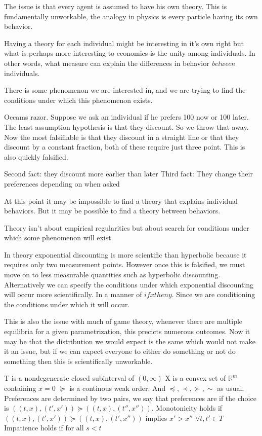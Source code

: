 \documentclass[11pt]{article}
\numberwithin{equation}{section}
\begin{document}
The issue is that every agent is assumed to have his own theory. This is fundamentally unworkable, the analogy in physics is every particle having its own behavior. 

Having a theory for each individual might be interesting in it's own right but what is perhaps more interesting to economics is the unity among individuals. In other words, what measure can explain the differences in behavior \textit{between} individuals. 

There is some phenomenon we are interested in, and we are trying to find the conditions under which this phenomenon exists. 

Occams razor. Suppose we ask an individual if he prefers 100 now or 100 later. The least assumption hypothesis is that they discount. So we throw that away. Now the most falsifiable is that they discount in a straight line or that they discount by a constant fraction, both of these require just three point. This is also quickly falsified. 

Second fact: they discount more earlier than later
Third fact: They change their preferences depending on when asked

At this point it may be impossible to find a theory that explains individual behaviors. But it may be possible to find a theory between behaviors.  

Theory isn't about empirical regularities but about search for conditions under which some phenomenon will exist. 

In theory exponential discounting is more scientific than hyperbolic because it requires only two measurement points. However once this is falsified, we must move on to less measurable quantities such as hyperbolic discounting. Alternatively we can specify the conditions under which exponential discounting will occur more scientifically. In a manner of $if x then y$. Since we are conditioning the conditions under which it will occur.

This is also the issue with much of game theory, whenever there are multiple equilibria for a given parametrization, this precicts numerous outcomes. Now it may be that the distribution we would expect is the same which would not make it an issue, but if we can expect everyone to either do something or not do something then this is scientifically unworkable. 

T is a nondegenerate closed subinterval of $(0,\infty)$
X is a convex set of $\mathbb{R}^m$ containing $x=0$
$\succeq$ is a continous weak order. And $\preceq, \prec, \succ, \sim$ as usual. Preferences are determined by two pairs, we say that preferences are if the choice is $((t,x),(t',x')) \succeq ((t,x),(t'',x''))$. 
Monotonicity holds if $((t,x),(t',x')) \succeq ((t,x),(t',x''))$ implies $x'>x''$ $\forall t, t' \in T $
Impatience holds if for all $s<t$ 
\end{document}
